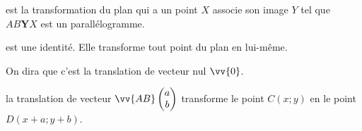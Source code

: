 \vfill
\begin{definition} est la transformation du plan qui a un point $X$ associe son image $Y$ tel que $AB\textbf{Y}X$ est un parallélogramme.  
\end{definition}
\begin{definition} est une identité. Elle transforme tout point du plan en lui-même. 
	
	On dira que c'est la translation de vecteur nul $\vv{0}$. 
\end{definition} 


\begin{definition} la translation de vecteur $\vv{AB}\begin{pmatrix}
		a\\b
	\end{pmatrix}$ transforme le point $C(x;y)$ en le point $D(x+a; y+b)$.
\end{definition}

